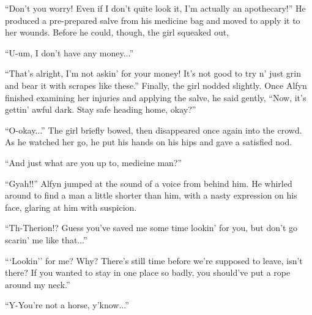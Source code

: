 ``Don't you worry! Even if I don't quite look it, I'm actually an apothecary!'' He produced a pre-prepared salve from his medicine bag and moved to apply it to her wounds. Before he could, though, the girl squeaked out,

``U-um, I don't have any money...''

``That's alright, I'm not askin' for your money! It's not good to try n' just grin and bear it with scrapes like these.'' Finally, the girl nodded slightly. Once Alfyn finished examining her injuries and applying the salve, he said gently, ``Now, it's gettin' awful dark. Stay safe heading home, okay?''

``O-okay...'' The girl briefly bowed, then disappeared once again into the crowd. As he watched her go, he put his hands on his hips and gave a satisfied nod.

``And just what are you up to, medicine man?''

``Gyah!!'' Alfyn jumped at the sound of a voice from behind him. He whirled around to find a man a little shorter than him, with a nasty expression on his face, glaring at him with suspicion.

``Th-Therion!? Guess you've saved me some time lookin' for you, but don't go scarin' me like that...''

```Lookin'' for me? Why? There's still time before we're supposed to leave, isn't there? If you wanted to stay in one place so badly, you should've put a rope around my neck.''

``Y-You're not a horse, y'know...''

\printendnotes

